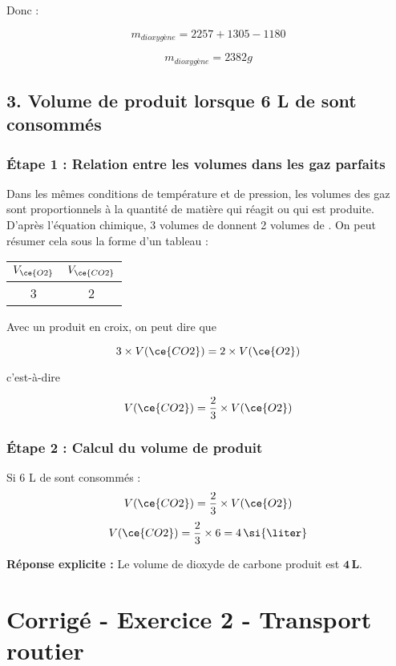 \documentclass[a4paper,12pt]{article}
\begin{document}
Donc : 

\[
m_{dioxygène} = 2257 + 1305 - 1180
\] 

\[
m_{dioxygène} = 2382 \si{g}
\] 

\subsection*{3. Volume de  produit lorsque 6 L de  sont consommés}

\subsubsection*{Étape 1 : Relation entre les volumes dans les gaz parfaits}
Dans les mêmes conditions de température et de pression, les volumes des gaz sont proportionnels à la quantité de matière qui réagit ou qui est produite. D'après l'équation chimique, 3 volumes de  donnent 2 volumes de . On peut résumer cela sous la forme d'un tableau : 

\vspace{1em}
\begin{center}
\begin{tabular}{SS}
  \toprule
  {$V_{\ce{O2}}$} & {$V_{\ce{CO2}}$} \\
  \midrule
  {3} & {2} \\
  \bottomrule
\end{tabular}
\end{center}

\vspace{1em}

Avec un produit en croix, on peut dire que 

\[
3 \times V(\ce{CO2}) = 2 \times V(\ce{O2})
\]

c'est-à-dire 

\[
V(\ce{CO2}) = \frac{2}{3} \times V(\ce{O2})
\]

\subsubsection*{Étape 2 : Calcul du volume de  produit}
Si 6 L de  sont consommés :
\[
V(\ce{CO2}) = \frac{2}{3} \times V(\ce{O2})
\]
\[
V(\ce{CO2}) = \frac{2}{3} \times 6 = 4 \, \si{\liter}
\]

\textbf{Réponse explicite :} Le volume de dioxyde de carbone produit est \(\mathbf{4 \, \si{\liter}}\).

\section{Corrigé - Exercice 2 - Transport routier}
\end{document}
